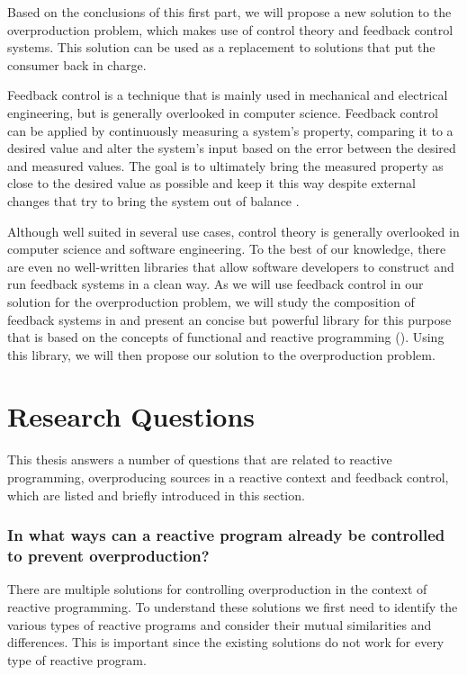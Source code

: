 Based on the conclusions of this first part, we will propose a new solution to the overproduction problem, which makes use of control theory and feedback control systems. This solution can be used as a replacement to solutions that put the consumer back in charge.

Feedback control is a technique that is mainly used in mechanical and electrical engineering, but is generally overlooked in computer science. Feedback control can be applied by continuously measuring a system's property, comparing it to a desired value and alter the system's input based on the error between the desired and measured values. The goal is to ultimately bring the measured property as close to the desired value as possible and keep it this way despite external changes that try to bring the system out of balance \cite{janert2013-feedback}.

Although well suited in several use cases, control theory is generally overlooked in computer science and software engineering. To the best of our knowledge, there are even no well-written libraries that allow software developers to construct and run feedback systems in a clean way. As we will use feedback control in our solution for the overproduction problem, we will study the composition of feedback systems in  and present an concise but powerful library for this purpose that is based on the concepts of functional and reactive programming (). Using this library, we will then propose our solution to the overproduction problem.

\section*{Research Questions}
This thesis answers a number of questions that are related to reactive programming, overproducing sources in a reactive context and feedback control, which are listed and briefly introduced in this section.

\subsubsection*{In what ways can a reactive program already be controlled to prevent overproduction?}
There are multiple solutions for controlling overproduction in the context of reactive programming. To understand these solutions we first need to identify the various types of reactive programs and consider their mutual similarities and differences. This is important since the existing solutions do not work for every type of reactive program.

